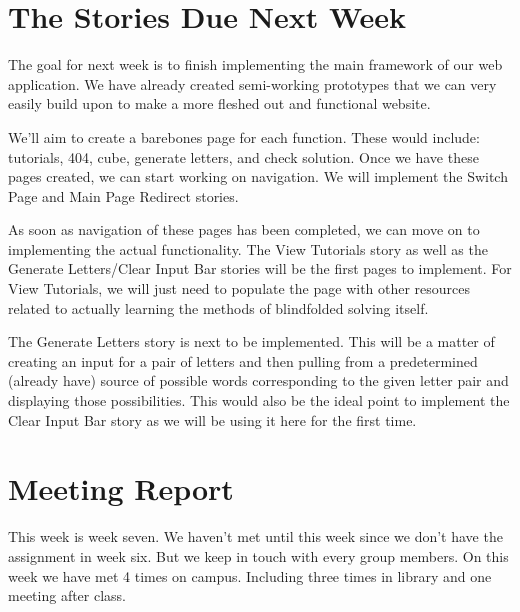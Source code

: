 \documentclass[12pt]{article}
\begin{document}
\section{The Stories Due Next Week}

\par
The goal for next week is to finish implementing the main framework of our web application. We have already created semi-working prototypes that we can very easily build upon to make a more fleshed out and functional website. \\

\par
We’ll aim to create a barebones page for each function. These would include: tutorials, 404, cube, generate letters, and check solution. Once we have these pages created, we can start working on navigation. We will implement the Switch Page and Main Page Redirect stories. \\

\par
As soon as navigation of these pages has been completed, we can move on to implementing the actual functionality. The View Tutorials story as well as the Generate Letters/Clear Input Bar stories will be the first pages to implement. For View Tutorials, we will just need to populate the page with other resources related to actually learning the methods of blindfolded solving itself. \\

\par
The Generate Letters story is next to be implemented. This will be a matter of creating an input for a pair of letters and then pulling from a predetermined (already have) source of possible words corresponding to the given letter pair and displaying those possibilities. This would also be the ideal point to implement the Clear Input Bar story as we will be using it here for the first time. \\

\section{Meeting Report}

\par
This week is week seven. We haven’t met until this week since we don’t have the assignment in week six. But we keep in touch with every group members. On this week we have met 4 times on campus. Including three times in library and one meeting after class. \\
\end{document}
